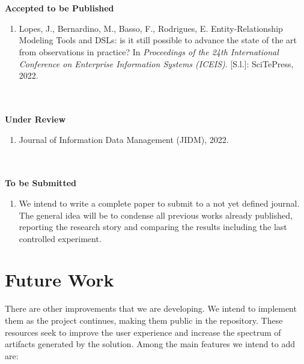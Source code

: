 \\~\\
\textbf{Accepted to be Published} 

    \begin{enumerate}[label=\roman*.]
        \item Lopes, J., Bernardino, M., Basso, F., Rodrigues, E. Entity-Relationship Modeling Tools and DSLs: is it still possible to advance the state of the art from observations in practice? In \textit{Proceedings of the 24th International Conference on Enterprise Information Systems (ICEIS)}. [S.l.]: SciTePress, 2022.
    \end{enumerate} 

\\~\\
\textbf{Under Review}  

\begin{enumerate}[label=\roman*.]
    \item Journal of Information Data Management (JIDM), 2022.
\end{enumerate} 

\linebreak
\\~\\
\textbf{To be Submitted} 
    \begin{enumerate}[label=\roman*.]
        \item We intend to write a complete paper to submit to a not yet defined journal.
        The general idea will be to condense all previous works already published, reporting the research story and comparing the results including the last controlled experiment.
    \end{enumerate} 

\section{Future Work}

There are other improvements that we are developing.
We intend to implement them as the project continues, making them public in the repository.
These resources seek to improve the user experience and increase the spectrum of artifacts generated by the solution.
Among the main features we intend to add are:

